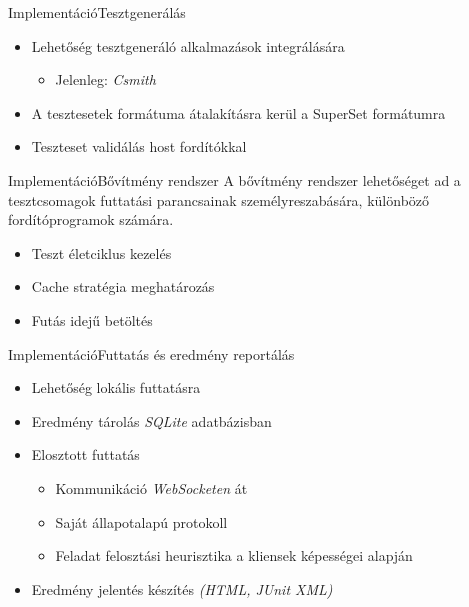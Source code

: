 \documentclass[aspectratio=169,9pt]{beamer}
\begin{document}
    \begin{frame}{Implementáció}{Tesztgenerálás}
        \begin{itemize}
            \item Lehetőség tesztgeneráló alkalmazások integrálására
                  \begin{itemize}
                      \item Jelenleg: \textit{Csmith}
                  \end{itemize}
            \item A tesztesetek formátuma átalakításra kerül a \alert{SuperSet} formátumra
            \item Teszteset validálás host fordítókkal
        \end{itemize}
    \end{frame}

    \begin{frame}{Implementáció}{Bővítmény rendszer}
        A bővítmény rendszer lehetőséget ad a tesztcsomagok futtatási parancsainak személyreszabására, különböző
        fordítóprogramok számára.

        \vspace{12pt}
        \begin{itemize}
            \item Teszt életciklus kezelés
            \item Cache stratégia meghatározás
            \item Futás idejű betöltés
        \end{itemize}
    \end{frame}

    \begin{frame}{Implementáció}{Futtatás és eredmény reportálás}
        \begin{itemize}
            \item Lehetőség lokális futtatásra
            \item Eredmény tárolás \textit{SQLite} adatbázisban
            \item Elosztott futtatás
                  \begin{itemize}
                      \item Kommunikáció \textit{WebSocketen} át
                      \item Saját állapotalapú protokoll
                      \item Feladat felosztási heurisztika a kliensek képességei alapján
                  \end{itemize}
            \item Eredmény jelentés készítés \textit{(HTML, JUnit XML)}
        \end{itemize}
    \end{frame}
\end{document}
